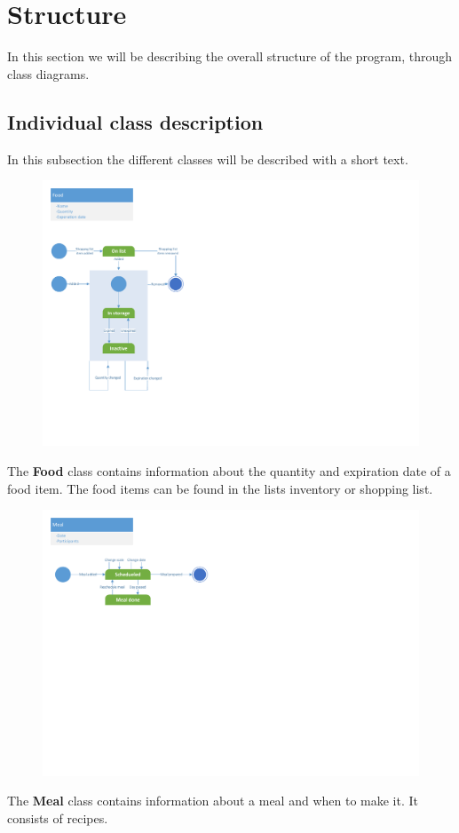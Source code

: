 \section{Structure}
In this section we will be describing the overall structure of the program, through class diagrams.

\subsection{Individual class description}
In this subsection the different classes will be described with a short text.

\begin{figure}[H]
	\centering
	\includegraphics[clip=true, trim=0.5cm 3.5cm 18.5cm 0.5cm]{Development/ProblemDomain/FoodClass.pdf}
	\label{FoodClass}
\end{figure}
The \textbf{Food} class contains information about the quantity and expiration date of a food item. The food items can be found in the lists inventory or shopping list.

\begin{figure}[H]
	\centering
	\includegraphics[clip=true, trim=0.5cm 13cm 16.5cm 0.5cm]{Development/ProblemDomain/MealClass.pdf}
	\label{MealClass}
\end{figure}
The \textbf{Meal} class contains information about a meal and when to make it. It consists of recipes.

